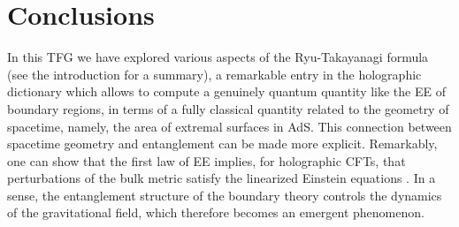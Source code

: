 \documentclass[twocolumn]{revtex4-2}
\begin{document}
\section{Conclusions} \label{s:Conclusions}
In this TFG we have explored various aspects of the Ryu-Takayanagi formula (see the introduction for a summary), a remarkable entry in the holographic dictionary which allows to compute a genuinely quantum quantity like the EE of boundary regions, in terms of a fully classical quantity related to the geometry of spacetime, namely, the area of extremal surfaces in AdS. This connection between spacetime geometry and entanglement can be made more explicit. Remarkably, one can show that the first law of EE implies, for holographic CFTs, that perturbations of the bulk metric satisfy the linearized Einstein equations \cite{faulkner_gravitation_2014}. In a sense, the entanglement structure of the boundary theory controls the dynamics of the gravitational field, which therefore becomes an emergent phenomenon.



\begin{acknowledgments}


    
\end{acknowledgments}




% 
\end{document}
